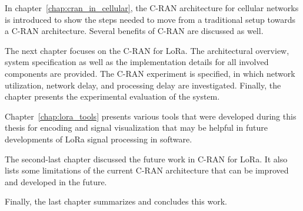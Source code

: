 In chapter~\ref{chap:cran_in_cellular}, the C-RAN architecture for cellular networks is introduced to show the steps needed to move from a traditional setup towards a C-RAN architecture.
Several benefits of C-RAN are discussed as well.

The next chapter focuses on the C-RAN for LoRa. 
The architectural overview, system specification as well as the implementation details for all involved components are provided. 
The C-RAN experiment is specified, in which network utilization, network delay, and processing delay are investigated.
Finally, the chapter presents the experimental evaluation of the system.

Chapter~\ref{chap:lora_tools} presents various tools that were developed during this thesis for encoding and signal visualization that may be helpful in future developments of LoRa signal processing in software.

The second-last chapter discussed the future work in C-RAN for LoRa. It also lists some limitations of the current C-RAN architecture that can be improved and developed in the future.

Finally, the last chapter summarizes and concludes this work.





